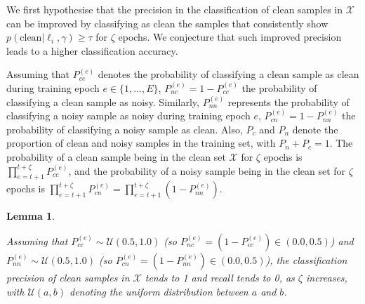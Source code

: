 \documentclass[review]{elsarticle}
\newtheorem{lemma}[theorem]{Lemma}
\begin{document}
We first hypothesise that the precision in the classification of clean samples in $\mathcal{X}$ can be improved by classifying as clean the samples that consistently show $p(\text{clean}|\ell_{i},\gamma) \geq \tau$ for $\zeta$ epochs.  
We conjecture that such improved precision leads to a higher classification accuracy.

Assuming that $P^{(e)}_{cc}$ denotes the probability of classifying a clean sample as clean during training epoch $e \in \{1,...,E\}$, $P^{(e)}_{nc} = 1 - P^{(e)}_{cc}$ the probability of classifying a clean sample as noisy. Similarly, $P^{(e)}_{nn}$ represents the probability of classifying a noisy sample as noisy during training epoch $e$, $P^{(e)}_{cn}=1-P^{(e)}_{nn}$ the probability of classifying a noisy sample as clean. Also, $P_c$ and $P_n$ denote the proportion of clean and noisy samples in the training set, with $P_n+P_c=1$.  The probability of a clean sample being in the clean set $\mathcal{X}$ for $\zeta$ epochs is $\prod_{e=t+1}^{t+\zeta} P^{(e)}_{cc}$, and 
the probability of a noisy sample being in the clean set for $\zeta$ epochs is $\prod_{e=t+1}^{t+\zeta} P^{(e)}_{cn}=\prod_{e=t+1}^{t+\zeta}(1-P^{(e)}_{nn})$.


\begin{lemma}
\label{lemma:zeta}

Assuming that $P^{(e)}_{cc} \sim \mathcal{U}(0.5,1.0)$ (so $P^{(e)}_{nc} = (1-P^{(e)}_{cc}) \in (0.0,0.5)$) and $P^{(e)}_{nn} \sim \mathcal{U}(0.5,1.0)$ (so $P^{(e)}_{cn} = (1-P^{(e)}_{nn}) \in (0.0,0.5)$), the classification precision of clean samples in $\mathcal{X}$ tends to 1 and recall tends to 0, as $\zeta$ increases, with $\mathcal{U}(a,b)$ denoting the uniform distribution between $a$ and $b$.

\end{lemma}
\end{document}
